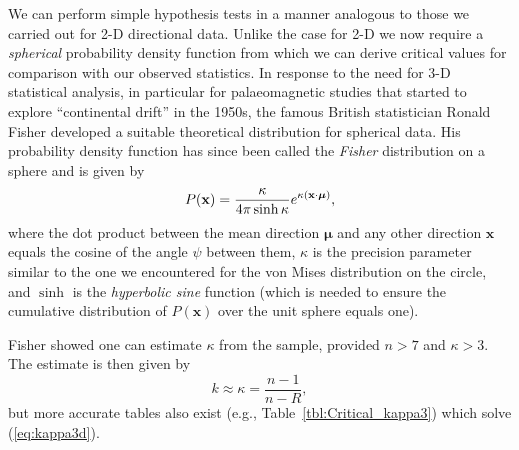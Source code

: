 We can perform simple hypothesis tests in a manner analogous to those we carried out for 2-D directional 
data.  Unlike the case for 2-D we now require a \emph{spherical} probability density function from which we can derive critical values for
comparison with our observed statistics.  In response to the need for 3-D statistical analysis, in particular
for palaeomagnetic studies that started to explore ``continental drift'' in the 1950s, the famous British
statistician Ronald Fisher developed a suitable theoretical distribution
for spherical data.  His probability density function has since been called the \emph{Fisher} distribution on a sphere and is
given by
\begin{equation}
	\index{Probability distribution!Fisher}
	\index{Fisher distribution}
P(\mathbf{x}) = \frac{ \kappa}{ 4 \pi \sinh \kappa} e^{\kappa \left(\mathbf{x} \cdot \boldsymbol{\mu} \right)},
\label{eq:fisher}
\end{equation}	 	
where the dot product between the mean direction $\boldsymbol{\mu}$ and
any other direction $\mathbf{x}$ equals the cosine of the angle $\psi$ between them, $\kappa$ is the precision parameter similar to the one we encountered
for the von Mises distribution on the circle, and $\sinh$ is the \emph{hyperbolic sine} function (which is needed to ensure the cumulative distribution
of $P(\mathbf{x})$ over the unit sphere equals one).

Fisher showed one can estimate $\kappa$ from the sample, provided $n > 7$ and $\kappa > 3$.
The estimate is then given by
\begin{equation}
k \approx \kappa = \frac{n-1}{n-R},
\end{equation}
but more accurate tables also exist (e.g., Table~\ref{tbl:Critical_kappa3}) which solve (\ref{eq:kappa3d}).

